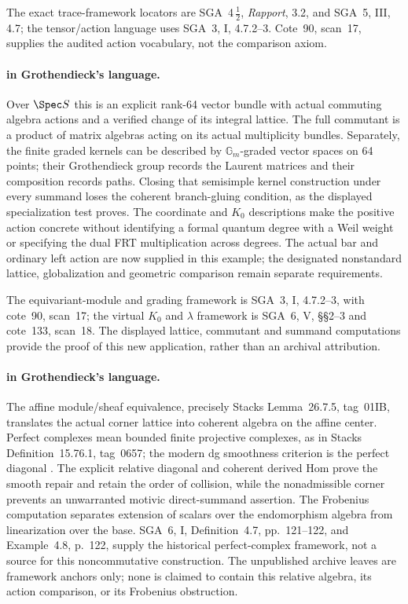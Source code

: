 The exact trace-framework locators are SGA~4\,$\frac12$, \emph{Rapport}, 3.2, and SGA~5, III, 4.7; the tensor/action language uses SGA~3, I, 4.7.2--3. Cote~90, scan~17, supplies the audited action vocabulary, not the comparison axiom.


\paragraph{ in Grothendieck's language.}
Over $\Spec S$ this is an explicit rank-64 vector bundle with
actual commuting algebra actions and a verified change of its
integral lattice. The full commutant is a product of matrix
algebras acting on its actual multiplicity bundles.
Separately, the finite graded kernels can be described by
$\mathbb G_m$-graded vector spaces on 64 points; their
Grothendieck group records the Laurent matrices and their
composition records paths. Closing that semisimple kernel
construction under every summand loses the coherent branch-gluing
condition, as the displayed specialization test proves.
The coordinate and $K_0$ descriptions make the positive action
concrete without identifying a formal quantum degree with a Weil
weight or specifying the dual FRT multiplication across degrees.
The actual bar and ordinary left action are now supplied in this
example; the designated nonstandard lattice, globalization and
geometric comparison remain separate requirements.

The equivariant-module and grading framework is SGA~3, I,
4.7.2--3, with cote~90, scan~17; the virtual $K_0$ and $\lambda$
framework is SGA~6, V, \S\S2--3 and cote~133, scan~18.
The displayed lattice, commutant and summand computations provide
the proof of this new application, rather than an archival attribution.


\paragraph{ in Grothendieck's language.}
The affine module/sheaf equivalence, precisely
Stacks Lemma~26.7.5, tag~01IB, translates the actual
corner lattice into coherent algebra on the affine
center. Perfect complexes mean bounded finite
projective complexes, as in Stacks Definition~15.76.1,
tag~0657; the modern dg smoothness criterion is
the perfect diagonal
\cite[\S5.1, pp.~13--14]{TabuadaWeil}.
The explicit relative diagonal and coherent derived
Hom prove the smooth repair and retain the order of
collision, while the nonadmissible corner prevents
an unwarranted motivic direct-summand assertion.
The Frobenius computation separates extension of
scalars over the endomorphism algebra from
linearization over the base. SGA~6, I, Definition~4.7, pp.~121--122, and
Example~4.8, p.~122, supply the historical perfect-complex framework, not a
source for this noncommutative construction.
The unpublished archive leaves are framework
anchors only; none is claimed to contain this
relative algebra, its action comparison, or its
Frobenius obstruction.

